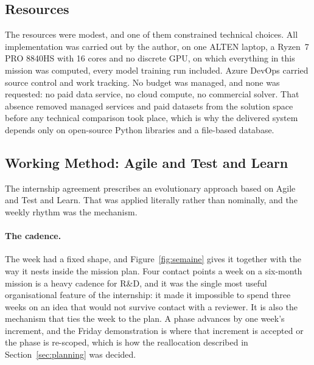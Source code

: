 \subsection{Resources}
\label{sec:ressources}

The resources were modest, and one of them constrained technical choices. All implementation
was carried out by the author, on one ALTEN laptop, a Ryzen~7 PRO 8840HS with
16 cores and no discrete GPU, on which everything in this mission was computed, every model
training run included. Azure DevOps carried source control and work tracking. No budget was
managed, and none was requested: no paid data service, no cloud compute, no commercial solver.
That absence removed managed services and paid datasets from the solution space before any
technical comparison took place, which is why the delivered system depends only on open-source
Python libraries and a file-based database.

\subsection{Working Method: Agile and Test and Learn}
\label{sec:methode}

The internship agreement prescribes an evolutionary approach based on Agile and Test and
Learn. That was applied literally rather than nominally, and the weekly rhythm was the
mechanism.

\paragraph{The cadence.}
The week had a fixed shape, and Figure~\ref{fig:semaine} gives it together with the way it
nests inside the mission plan. Four contact points a week on a six-month mission is a heavy
cadence for R\&D, and it was the single most useful organisational feature of the internship:
it made it impossible to spend three weeks on an idea that would not survive contact with a
reviewer. It is also the mechanism that ties the week to the plan. A phase advances by one
week's increment, and the Friday demonstration is where that increment is accepted or the
phase is re-scoped, which is how the reallocation described in Section~\ref{sec:planning} was
decided.

